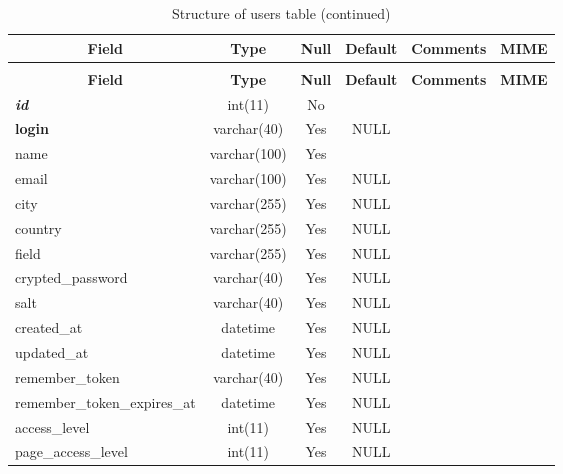\begin{enumerate}
%
%
 \begin{longtable}{|l|c|c|c|l|l|} 
 \caption{Structure of users table} \label{tab:users} \\
 \hline \multicolumn{1}{|c|}{\textbf{Field}} & \multicolumn{1}{|c|}{\textbf{Type}} & \multicolumn{1}{|c|}{\textbf{Null}} & \multicolumn{1}{|c|}{\textbf{Default}} & \multicolumn{1}{|c|}{\textbf{Comments}} & \multicolumn{1}{|c|}{\textbf{MIME}} \\ \hline \hline
\endfirsthead
 \caption{Structure of users table (continued)} \\ 
 \hline \multicolumn{1}{|c|}{\textbf{Field}} & \multicolumn{1}{|c|}{\textbf{Type}} & \multicolumn{1}{|c|}{\textbf{Null}} & \multicolumn{1}{|c|}{\textbf{Default}} & \multicolumn{1}{|c|}{\textbf{Comments}} & \multicolumn{1}{|c|}{\textbf{MIME}} \\ \hline \hline \endhead \endfoot 
\textbf{\textit{id}} & int(11) & No &  &  &  \\ \hline 
\textbf{login} & varchar(40) & Yes & NULL &  &  \\ \hline 
name & varchar(100) & Yes &  &  &  \\ \hline 
email & varchar(100) & Yes & NULL &  &  \\ \hline 
city & varchar(255) & Yes & NULL &  &  \\ \hline 
country & varchar(255) & Yes & NULL &  &  \\ \hline 
field & varchar(255) & Yes & NULL &  &  \\ \hline 
crypted\_password & varchar(40) & Yes & NULL &  &  \\ \hline 
salt & varchar(40) & Yes & NULL &  &  \\ \hline 
created\_at & datetime & Yes & NULL &  &  \\ \hline 
updated\_at & datetime & Yes & NULL &  &  \\ \hline 
remember\_token & varchar(40) & Yes & NULL &  &  \\ \hline 
remember\_token\_expires\_at & datetime & Yes & NULL &  &  \\ \hline 
access\_level & int(11) & Yes & NULL &  &  \\ \hline 
page\_access\_level & int(11) & Yes & NULL &  &  \\ \hline 
 \end{longtable}


\end{enumerate}

